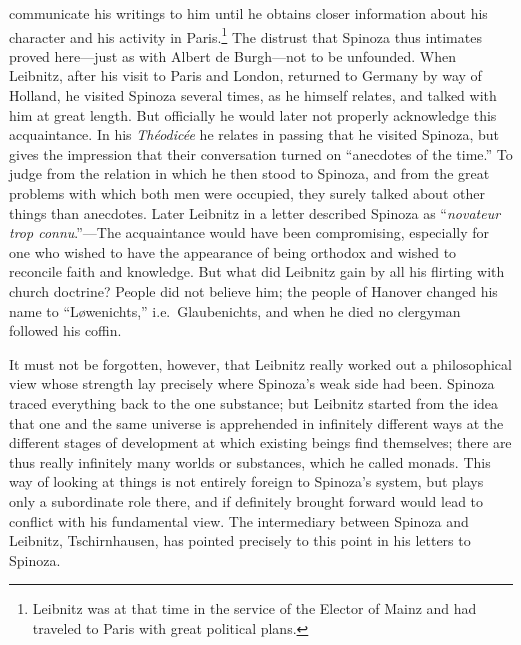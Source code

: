 \documentclass[12pt]{book}
\newcommand{\opage}[1]{\marginnote{\footnotesize\textit{[#1]}}}
\begin{document}
communicate his writings to him until he obtains closer information about his
character and his activity in Paris.\footnote{Leibnitz was at that time in the service
of the Elector of Mainz and had traveled to Paris with great political plans.} The
distrust that Spinoza thus intimates proved here---just as with Albert de Burgh---not
to be unfounded. When Leibnitz, after his visit to Paris and London, returned to
Germany by way of Holland, he visited Spinoza several times, as he himself relates, and
talked with him at great length. But officially he would later not properly acknowledge
this acquaintance. In his \textit{Théodicée} he relates in passing that he visited
Spinoza, but gives the impression that their conversation turned on ``anecdotes of the
time.'' To judge from the relation in which he then stood to Spinoza, and from the
great problems with which both men were occupied, they surely talked about other things
than anecdotes. Later Leibnitz in a letter described Spinoza as ``\textit{novateur trop
connu}.''---The acquaintance would have been compromising, especially for one who
wished to have the appearance of being orthodox and wished to reconcile faith and
knowledge. But what did Leibnitz gain by all his flirting with church doctrine? People
did not believe him; the people of Hanover changed his name to ``Løwenichts,'' i.e.\
Glaubenichts, and when he died no clergyman followed his coffin.

\opage{67}It must not be forgotten, however, that Leibnitz really worked out a
philosophical view whose strength lay precisely where Spinoza's weak side had been.
Spinoza traced everything back to the one substance; but Leibnitz started from the
idea that one and the same universe is apprehended in infinitely different ways at the
different stages of development at which existing beings find themselves; there are
thus really infinitely many worlds or substances, which he called monads. This way of
looking at things is not entirely foreign to Spinoza's system, but plays only a
subordinate role there, and if definitely brought forward would lead to conflict with
his fundamental view. The intermediary between Spinoza and Leibnitz, Tschirnhausen, has
pointed precisely to this point in his letters to Spinoza.
\end{document}
